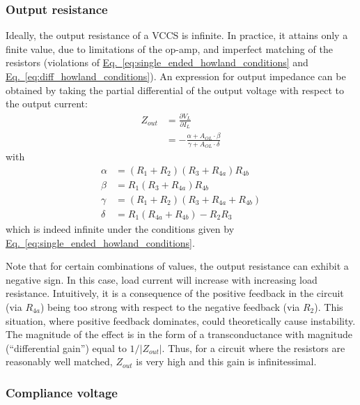 \documentclass[10pt]{article}
\newcommand{\briefeqlink}[1]{\hyperref[#1]{Eq.~\ref*{#1}}\xspace }
\begin{document}
\subsubsection{Output resistance}
\label{sec:singla_ended_output_resistance}

Ideally, the output resistance of a VCCS is infinite. In practice, it attains only a finite value, due to limitations of the op-amp, and imperfect matching of the resistors (violations of \briefeqlink{eq:single_ended_howland_conditions} and \briefeqlink{eq:diff_howland_conditions}). An expression for output impedance can be obtained by taking the partial differential of the output voltage with respect to the output current:
\begin{align}
\label{eq:rout_single_ended}
Z_{out} &= \frac{\partial V_L}{\partial{}I_L}\nonumber\\
&= -\frac{\alpha + A_{OL}\cdot\beta}{\gamma + A_{OL}\cdot\delta}
\end{align}
with
\begin{align}
\alpha &= (R_1 + R_2) (R_3 + R_{4a}) R_{4b}\nonumber\\
\beta &= R_1 (R_3 + R_{4a}) R_{4b}\nonumber\\
\gamma &= (R_1 + R_2) (R_3 + R_{4a} + R_{4b})\nonumber\\
\delta &= R_1 (R_{4a} + R_{4b}) - R_2 R_3\nonumber
\end{align}
which is indeed infinite under the conditions given by \briefeqlink{eq:single_ended_howland_conditions}.

Note that for certain combinations of values, the output resistance can exhibit a negative sign. In this case, load current will increase with increasing load resistance. Intuitively, it is a consequence of the positive feedback in the circuit (via $R_{4a}$) being too strong with respect to the negative feedback (via $R_2$). This situation, where positive feedback dominates, could theoretically cause instability. The magnitude of the effect is in the form of a transconductance with magnitude (``differential gain'') equal to $1/|Z_{out}|$. Thus, for a circuit where the resistors are reasonably well matched, $Z_{out}$ is very high and this gain is infinitessimal.



\subsubsection{Compliance voltage}
\label{sec:single_ended_compliance_voltage}
\end{document}

